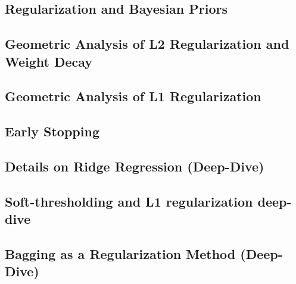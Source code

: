 \subsection{Regularization and Bayesian Priors}


\subsection{Geometric Analysis of L2 Regularization and Weight Decay}


\subsection{Geometric Analysis of L1 Regularization}


\subsection{Early Stopping}


\subsection{Details on Ridge Regression (Deep-Dive)}


\subsection{Soft-thresholding and L1 regularization deep-dive}


\subsection{Bagging as a Regularization Method (Deep-Dive)}







